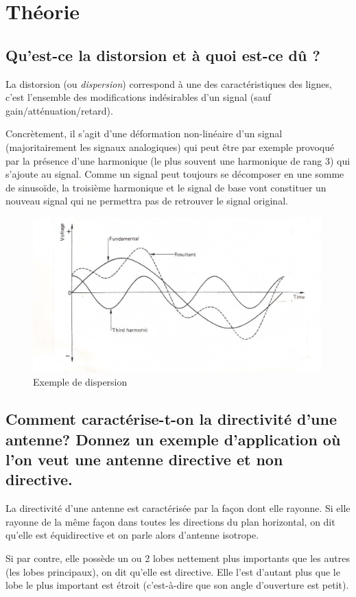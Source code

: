 \section{Théorie}

\subsection{Qu'est-ce la distorsion et à quoi est-ce dû ?}

La distorsion (ou \textit{dispersion}) correspond à une des caractéristiques des lignes, c'est l'ensemble des modifications indésirables d'un signal (sauf gain/atténuation/retard).

Concrètement, il s'agit d'une déformation non-linéaire d'un signal (majoritairement les signaux analogiques) qui peut être par exemple provoqué par la présence d'une harmonique (le plus souvent une harmonique de rang 3) qui s'ajoute au signal. Comme un signal peut toujours se décomposer en une somme de sinusoïde, la troisième harmonique et le signal de base vont constituer un nouveau signal qui ne permettra pas de retrouver le signal original.

\begin{figure}[H]
    \centering
    \includegraphics[width=0.7\linewidth]{img/dispersion.png}
    \caption{Exemple de dispersion}
\end{figure}

\subsection{Comment caractérise-t-on la directivité d'une antenne? Donnez un exemple d'application où l'on veut une antenne directive et non directive.}

La directivité d'une antenne est caractérisée par la façon dont elle rayonne. Si elle rayonne de la même façon dans toutes les directions du plan horizontal, on dit qu'elle est équidirective et on parle alors d'antenne isotrope.

Si par contre, elle possède un ou 2 lobes nettement plus importants que les autres (les lobes principaux), on dit qu'elle est directive. Elle l'est d'autant plus que le lobe le plus important est étroit (c'est-à-dire que son angle d'ouverture est petit).

